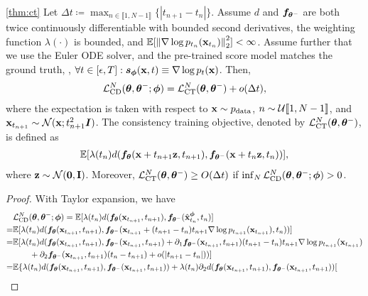\begin{appendices}
\begin{customthm}{\ref{thm:ct}}
    Let $\Delta t \coloneqq \max_{n \in \llbracket 1, N-1\rrbracket}\{|t_{n+1} - t_{n}|\}$. Assume $d$ and ${\bm{f}}_{{\bm{\theta}}^{-}}$ are both twice continuously differentiable with bounded second derivatives, the weighting function $\lambda(\cdot)$ is bounded, and $\mathbb{E}[\left\lVert\nabla \log p_{t_n}({\mathbf{x}}_{t_{n}})\right\rVert_2^2] < \infty$. Assume further that we use the Euler ODE solver, and the pre-trained score model matches the ground truth, \ie, $\forall t\in[\epsilon, T]: {\bm{s}}_{{\bm{\phi}}}({\mathbf{x}}, t) \equiv \nabla \log p_t({\mathbf{x}})$. Then,
    \begin{align*}
       \mathcal{L}_\text{CD}^N({\bm{\theta}}, {\bm{\theta}}^{-}; {\bm{\phi}}) = \mathcal{L}_\text{CT}^N({\bm{\theta}}, {\bm{\theta}}^{-}) + o(\Delta t),
    \end{align*}
    where the expectation is taken with respect to ${\mathbf{x}} \sim p_\text{data}$, $n \sim \mathcal{U}\llbracket 1,N-1 \rrbracket$, and ${\mathbf{x}}_{t_{n+1}} \sim \mathcal{N}({\mathbf{x}}; t_{n+1}^2 {\bm{I}})$. The consistency training objective, denoted by $\mathcal{L}_\text{CT}^N({\bm{\theta}}, {\bm{\theta}}^{-})$, is defined as
    \begin{align*}
        \mathbb{E}[\lambda(t_n) d({\bm{f}}_{\bm{\theta}}({\mathbf{x}} + t_{n+1}{\mathbf{z}}, t_{n+1}), {\bm{f}}_{{\bm{\theta}}^{-}}({\mathbf{x}} + t_n{\mathbf{z}}, t_n))],
    \end{align*}
    where ${\mathbf{z}} \sim \mathcal{N}(\bf{0}, {\bm{I}})$. Moreover, $\mathcal{L}_\text{CT}^N({\bm{\theta}}, {\bm{\theta}}^{-}) \geq O(\Delta t)$ if $\inf_N \mathcal{L}_\text{CD}^N({\bm{\theta}}, {\bm{\theta}}^{-}; {\bm{\phi}}) > 0$.
\end{customthm}
\begin{proof}
With Taylor expansion, we have
\begin{align}
    &\mcal{L}_\text{CD}^N(\vtheta, \vtheta^{-}; \vphi) = \mbb{E}[\lambda(t_n)d(\vf_\vtheta(\rvx_{t_{n+1}}, t_{n+1}), \vf_{\vtheta^{-}}(\hat{\rvx}_{t_n}^\vphi, t_n)]\notag \\
    =& \mbb{E}[\lambda(t_n) d(\vf_\vtheta(\rvx_{t_{n+1}}, t_{n+1}), \vf_{\vtheta^{-}}(\rvx_{t_{n+1}} + (t_{n+1} - t_n)t_{n+1} \nabla\log p_{t_{n+1}}(\rvx_{t_{n+1}}), t_n))]\notag \\
    =& \mbb{E}[\lambda(t_n) d(\vf_\vtheta(\rvx_{t_{n+1}}, t_{n+1}), \vf_{\vtheta^{-}}(\rvx_{t_{n+1}}, t_{n+1}) + \partial_1\vf_{\vtheta^{-}}(\rvx_{t_{n+1}}, t_{n+1})(t_{n+1} - t_n)t_{n+1} \nabla \log p_{t_{n+1}}(\rvx_{t_{n+1}})\notag \\
    &\qquad + \partial_2 \vf_{\vtheta^{-}}(\rvx_{t_{n+1}}, t_{n+1}) (t_n-t_{n+1}) + o(|t_{n+1} - t_n|) )]\notag \\
    =& \mbb{E}\{\lambda(t_n) d(\vf_\vtheta(\rvx_{t_{n+1}}, t_{n+1}),\vf_{\vtheta^{-}}(\rvx_{t_{n+1}}, t_{n+1})) + \lambda(t_n)\partial_2 d(\vf_\vtheta(\rvx_{t_{n+1}}, t_{n+1}),\vf_{\vtheta^{-}}(\rvx_{t_{n+1}}, t_{n+1}))[\notag \\

\end{align}
\end{proof}
\end{appendices}
